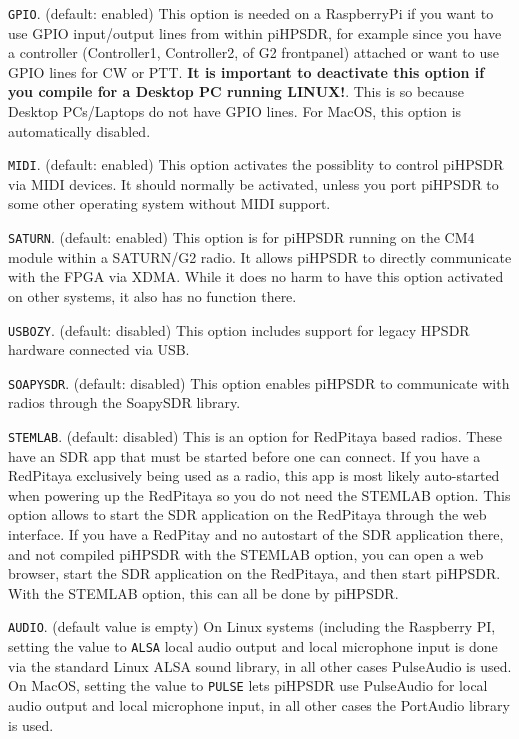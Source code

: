 \documentclass[12pt]{book}
\def\rett#1{\texttt{\color{red}#1}}
\begin{document}
\rett{GPIO}. (default: enabled) 
This option is needed on a RaspberryPi if you want to use GPIO input/output lines from
within piHPSDR, for example since you have a controller (Controller1, Controller2, of G2 frontpanel)
attached or want to use GPIO lines for CW or PTT. \textbf{It is important to deactivate this option
if you compile for a Desktop PC running LINUX!}. This is so because Desktop PCs/Laptops do not
have GPIO lines. For MacOS, this option is automatically disabled.

\rett{MIDI}. (default: enabled)
This option activates the possiblity to control piHPSDR via MIDI devices. It should normally be
activated, unless you port piHPSDR to some other operating system without MIDI support.

\rett{SATURN}. (default: enabled)
This option is for piHPSDR running on the CM4 module within a SATURN/G2 radio. It allows
piHPSDR to directly communicate with the FPGA via XDMA. While it does no harm to have this option activated
on other systems, it also has no function there.

\rett{USBOZY}. (default: disabled)
This option includes support for legacy HPSDR hardware connected via USB.

\rett{SOAPYSDR}. (default: disabled)
This option enables piHPSDR to communicate with radios through the SoapySDR library.

\rett{STEMLAB}. (default: disabled)
This is an option for RedPitaya based radios. These have an SDR app that must be
started before one can connect. If you have a RedPitaya exclusively being used as a radio, this
app is most likely auto-started when powering up the RedPitaya so you do not need the STEMLAB
option. This option allows to start the SDR application on the RedPitaya through the web interface.
If you have a RedPitay and no autostart of the SDR application there, and not compiled piHPSDR
with the STEMLAB option, you can open a web browser, start the SDR application on the RedPitaya,
and then start piHPSDR. With the STEMLAB option, this can all be done by piHPSDR.

\rett{AUDIO}. (default value is empty)
On Linux systems (including the Raspberry PI, setting the value to \texttt{ALSA} local audio 
output and local microphone input is done via the standard Linux ALSA sound library, in all other cases
PulseAudio is used. On MacOS, setting the value to \texttt{PULSE} lets piHPSDR use
PulseAudio for local audio output and local microphone input, in all other cases
the PortAudio library is used.
\end{document}
